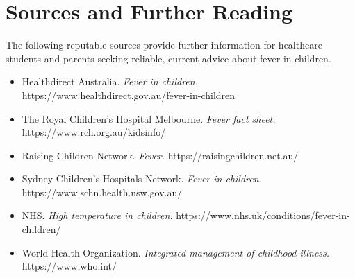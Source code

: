\section*{Sources and Further Reading}
The following reputable sources provide further information for healthcare students and parents seeking reliable, current advice about fever in children.
\begin{itemize}
    \item Healthdirect Australia. \textit{Fever in children.} https://www.healthdirect.gov.au/fever-in-children
    \item The Royal Children's Hospital Melbourne. \textit{Fever fact sheet.} https://www.rch.org.au/kidsinfo/
    \item Raising Children Network. \textit{Fever.} https://raisingchildren.net.au/
    \item Sydney Children's Hospitals Network. \textit{Fever in children.} https://www.schn.health.nsw.gov.au/
    \item NHS. \textit{High temperature in children.} https://www.nhs.uk/conditions/fever-in-children/
    \item World Health Organization. \textit{Integrated management of childhood illness.} https://www.who.int/
\end{itemize}
